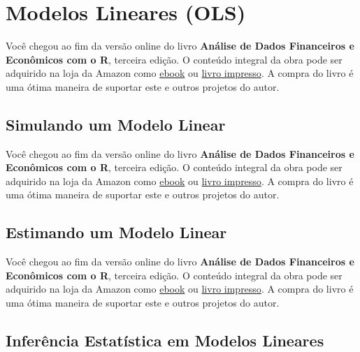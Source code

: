 \documentclass[
  11pt,
]{book}
\newenvironment{pleasebuyit}
{\begin{noteblock}
		
	} {\end{noteblock}}
\begin{document}
\hypertarget{modelos-lineares-ols}{%
\section{Modelos Lineares (OLS)}\label{modelos-lineares-ols}}

\begin{pleasebuyit}
Você chegou ao fim da versão online do livro \textbf{Análise de Dados
Financeiros e Econômicos com o R}, terceira edição. O conteúdo integral
da obra pode ser adquirido na loja da Amazon como
\href{https://www.amazon.com.br/dp/B08WNC27ZY}{ebook} ou
\href{https://www.amazon.com/dp/B08WP8CCDB}{livro impresso}. A compra do
livro é uma ótima maneira de suportar este e outros projetos do autor.
\end{pleasebuyit}

\hypertarget{simulando-um-modelo-linear}{%
\subsection{Simulando um Modelo Linear}\label{simulando-um-modelo-linear}}

\begin{pleasebuyit}
Você chegou ao fim da versão online do livro \textbf{Análise de Dados
Financeiros e Econômicos com o R}, terceira edição. O conteúdo integral
da obra pode ser adquirido na loja da Amazon como
\href{https://www.amazon.com.br/dp/B08WNC27ZY}{ebook} ou
\href{https://www.amazon.com/dp/B08WP8CCDB}{livro impresso}. A compra do
livro é uma ótima maneira de suportar este e outros projetos do autor.
\end{pleasebuyit}

\hypertarget{estimating-ols}{%
\subsection{Estimando um Modelo Linear}\label{estimating-ols}}

\begin{pleasebuyit}
Você chegou ao fim da versão online do livro \textbf{Análise de Dados
Financeiros e Econômicos com o R}, terceira edição. O conteúdo integral
da obra pode ser adquirido na loja da Amazon como
\href{https://www.amazon.com.br/dp/B08WNC27ZY}{ebook} ou
\href{https://www.amazon.com/dp/B08WP8CCDB}{livro impresso}. A compra do
livro é uma ótima maneira de suportar este e outros projetos do autor.
\end{pleasebuyit}

\hypertarget{testing-ols}{%
\subsection{Inferência Estatística em Modelos Lineares}\label{testing-ols}}
\end{document}
